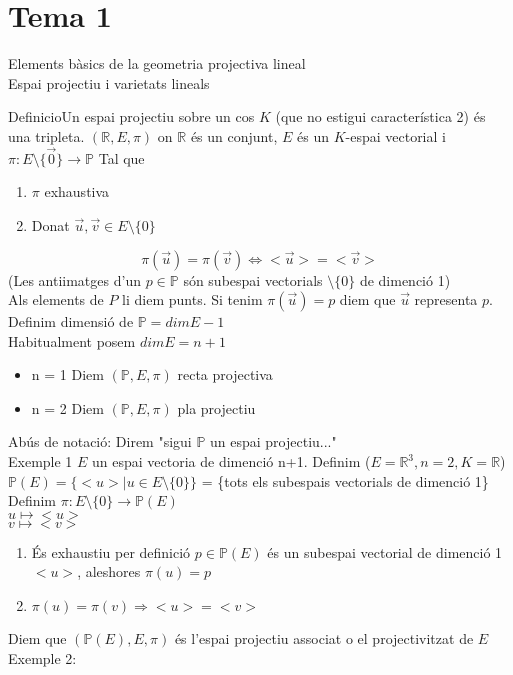 \documentclass{article}
\newcommand{\red}[2]{{#1}#2}
\newcommand{\R}{\mathds{R}}
\begin{document}
\section{Tema 1}
Elements bàsics de la geometria projectiva lineal\\
Espai projectiu i varietats lineals

\red{Definicio}{Un espai projectiu sobre un cos $K$ (que no estigui característica 2) és una tripleta. $(\R, E, \pi)$ on $\R$ és un conjunt, $E$ és un $K$-espai vectorial i $\pi:E\setminus\{\vec{0}\}\to\mathds{P}$}
Tal que
\begin{enumerate}
\item $\pi$ exhaustiva
\item Donat $\vec{u}, \vec{v} \in E\setminus\{0\}$
\end{enumerate}
$$\pi (\vec{u}) = \pi (\vec{v}) \Leftrightarrow <\vec{u}> = <\vec{v}>$$
(Les antiimatges d'un $p \in \mathds{P}$ són subespai vectorials $\setminus\{0\}$ de dimenció 1)\\

Als elements de $P$ li diem punts. Si tenim $\pi (\vec{u}) = p$ diem que $\vec{u}$ representa $p$.\\

Definim dimensió de $\mathds{P} = dim E -1$\\
Habitualment posem $dim E = n +1$
\begin{itemize}
\item n = 1 Diem $(\mathds{P}, E, \pi)$ recta projectiva
\item n = 2 Diem $(\mathds{P}, E, \pi)$ pla projectiu
\end{itemize}

Abús de notació: Direm "sigui $\mathds{P}$ un espai projectiu..."\\

Exemple 1 $E$ un espai vectoria de dimenció n+1. Definim ($E=\R^3, n=2, K=\R$)\\
$\mathds{P}(E) = \{<u> | u \in E \setminus\{0\}\}$ = \{tots els subespais vectorials de dimenció 1\}\\

Definim $\pi: E\setminus\{0\} \to \mathds{P}(E)$\\
$u \mapsto <u>$\\
$v \mapsto <v>$

\begin{enumerate}
\item És exhaustiu per definició $p \in \mathds{P}(E)$ és un subespai vectorial de dimenció 1 $<u>$, aleshores $\pi(u) = p$
\item $\pi(u) = \pi(v) \Rightarrow <u> = <v>$
\end{enumerate}
Diem que $(\mathds{P}(E), E, \pi)$ és l'espai projectiu associat o el projectivitzat de $E$\\

Exemple 2:
\end{document}
